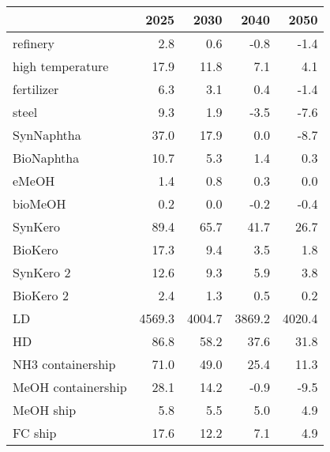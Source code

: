 \begin{tabular}{lrrrr}
\toprule
 & 2025 & 2030 & 2040 & 2050 \\
\midrule
refinery & 2.8 & 0.6 & -0.8 & -1.4 \\
high temperature & 17.9 & 11.8 & 7.1 & 4.1 \\
fertilizer & 6.3 & 3.1 & 0.4 & -1.4 \\
steel & 9.3 & 1.9 & -3.5 & -7.6 \\
SynNaphtha & 37.0 & 17.9 & 0.0 & -8.7 \\
BioNaphtha & 10.7 & 5.3 & 1.4 & 0.3 \\
eMeOH & 1.4 & 0.8 & 0.3 & 0.0 \\
bioMeOH & 0.2 & 0.0 & -0.2 & -0.4 \\
SynKero & 89.4 & 65.7 & 41.7 & 26.7 \\
BioKero & 17.3 & 9.4 & 3.5 & 1.8 \\
SynKero 2 & 12.6 & 9.3 & 5.9 & 3.8 \\
BioKero 2 & 2.4 & 1.3 & 0.5 & 0.2 \\
LD & 4569.3 & 4004.7 & 3869.2 & 4020.4 \\
HD & 86.8 & 58.2 & 37.6 & 31.8 \\
NH3 containership & 71.0 & 49.0 & 25.4 & 11.3 \\
MeOH containership & 28.1 & 14.2 & -0.9 & -9.5 \\
MeOH ship & 5.8 & 5.5 & 5.0 & 4.9 \\
FC ship & 17.6 & 12.2 & 7.1 & 4.9 \\
\bottomrule
\end{tabular}
